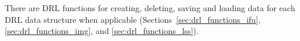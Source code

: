 There are \ac{DRL} functions for creating, deleting, saving and loading data for each \ac{DRL} data structure when applicable (Sections~\ref{sec:drl_functions_ifu}, \ref{sec:drl_functions_img}, and \ref{sec:drl_functions_lss}).










